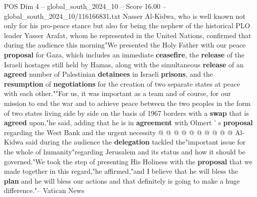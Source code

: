 \begin{textsample}{POS Dim 4 – global\_south\_2024\_10 – Score 16.00 – global\_south\_2024\_10/116166831.txt}
Nasser Al-Kidwa, who is well known not only for his pro-peace stance but also for being the nephew of the historical PLO leader Yasser Arafat, whom he represented in the United Nations, confirmed that during the audience this morning"We presented the Holy Father with our peace \textbf{proposal} for Gaza, which includes an immediate \textbf{ceasefire}, the \textbf{release} of the Israeli hostages still held by Hamas, along with the simultaneous \textbf{release} of an \textbf{agreed} number of Palestinian \textbf{detainees} in Israeli \textbf{prisons}, and the \textbf{resumption} of \textbf{negotiations} for the creation of two separate states at peace with each other.""For us, it was important as a team and of course, for our mission to end the war and to achieve peace between the two peoples in the form of two states living side by side on the basis of 1967 borders with a \textbf{swap} that is \textbf{agreed} upon,"he said, adding that he is in \textbf{agreement} with Olmert ' s \textbf{proposal} regarding the West Bank and the urgent necessity @ @ @ @ @ @ @ @ @ @ Al-Kidwa said during the audience the \textbf{delegation} tackled the"important issue for the whole of humanity"regarding Jerusalem and its status and how it should be governed."We took the step of presenting His Holiness with the \textbf{proposal} that we made together in this regard,"he affirmed,"and I believe that he will bless the \textbf{plan} and he will bless our actions and that definitely is going to make a huge difference."-- Vatican News

\end{textsample}
